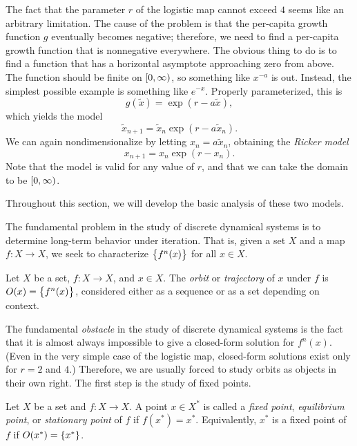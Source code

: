\documentclass{article}
\theoremstyle{plain}
\theoremstyle{definition}
\DeclarePairedDelimiter{\parensproto}{\lparen}{\rparen}
\newcommand{\parens}{\parensproto*}
\DeclarePairedDelimiter{\rhalfopenproto}{\lbrack}{\rparen}
\newcommand{\rhalfopen}{\rhalfopenproto*}
\newcommand{\orbit}[1]{O\parens{{#1}}}
\begin{document}
\begin{example}
  The fact that the parameter \(r\) of the logistic map cannot exceed \(4\) seems like an arbitrary limitation. The cause of the problem is that the per-capita growth function \(g\) eventually becomes negative; therefore, we need to find a per-capita growth function that is nonnegative everywhere. The obvious thing to do is to find a function that has a horizontal asymptote approaching zero from above. The function should be finite on \(\rhalfopen{0, \infty}\), so something like \(x^{-a}\) is out. Instead, the simplest possible example is something like \(e^{-x}\). Properly parameterized, this is
  \[
    g(\tilde{x}) = \exp(r - a\tilde{x}),
  \]
  which yields the model
  \[
    \tilde{x}_{n + 1} = \tilde{x}_{n}\exp(r - a\tilde{x}_{n}).
  \]
  We can again nondimensionalize by letting \(x_n = a\tilde{x}_n\), obtaining the \emph{Ricker model}
  \[
    x_{n + 1} = x_n\exp(r - x_n).
  \]
  Note that the model is valid for any value of \(r\), and that we can take the domain to be \(\rhalfopen{0, \infty}\).
\end{example}

Throughout this section, we will develop the basic analysis of these two models.

The fundamental problem in the study of discrete dynamical systems is to determine long-term behavior under iteration. That is, given a set \(X\) and a map \(f : X \to X\), we seek to characterize \(\set{f^n(x)}\) for all \(x \in X\).

\begin{definition}
  Let \(X\) be a set, \(f : X \to X\), and \(x \in X\). The \emph{orbit} or \emph{trajectory} of \(x\) under \(f\) is \(\orbit{x} = \set{f^n(x)}\), considered either as a sequence or as a set depending on context.
\end{definition}

The fundamental \emph{obstacle} in the study of discrete dynamical systems is the fact that it is almost always impossible to give a closed-form solution for \(f^n(x)\). (Even in the very simple case of the logistic map, closed-form solutions exist only for \(r = 2\) and \(4\).) Therefore, we are usually forced to study orbits as objects in their own right. The first step is the study of fixed points.

\begin{definition}
  Let \(X\) be a set and \(f : X \to X\). A point \(x \in X^*\) is called a \emph{fixed point}, \emph{equilibrium point}, or \emph{stationary point} of \(f\) if \(f(x^*) = x^*\). Equivalently, \(x^*\) is a fixed point of \(f\) if \(\orbit{x^*} = \set{x^*}\).
\end{definition}
\end{document}
